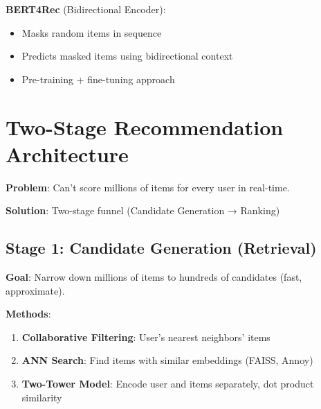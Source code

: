 \documentclass[10pt]{article}
\begin{document}
\textbf{BERT4Rec} (Bidirectional Encoder):
\begin{itemize}[leftmargin=*]
    \item Masks random items in sequence
    \item Predicts masked items using bidirectional context
    \item Pre-training + fine-tuning approach
\end{itemize}

\section{Two-Stage Recommendation Architecture}

\textbf{Problem}: Can't score millions of items for every user in real-time.

\textbf{Solution}: Two-stage funnel (Candidate Generation → Ranking)

\subsection{Stage 1: Candidate Generation (Retrieval)}

\textbf{Goal}: Narrow down millions of items to hundreds of candidates (fast, approximate).

\textbf{Methods}:
\begin{enumerate}[leftmargin=*]
    \item \textbf{Collaborative Filtering}: User's nearest neighbors' items
    \item \textbf{ANN Search}: Find items with similar embeddings (FAISS, Annoy)
    \item \textbf{Two-Tower Model}: Encode user and items separately, dot product similarity
\end{enumerate}
\end{document}
